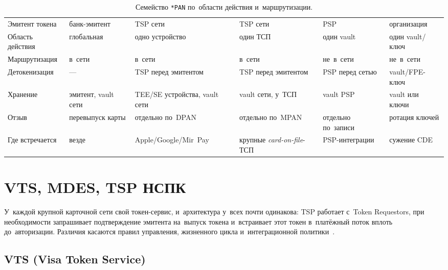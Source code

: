 \begin{table}[tbp]
  \caption{Семейство \texttt{*PAN} по~области действия и~маршрутизации.}\label{tab:token-scope-comparison}
  \begingroup
  \tablesetup
  \setlength{\tabcolsep}{3pt}
  \begin{tabularx}{\textwidth}{
      @{}P{0.16\textwidth}
      Y Y Y Y Y@{}
    }
    \toprule
    \headrow
     &  &  &  &
     &  \\
    \midrule
    Эмитент токена   & банк-эмитент & TSP сети & TSP сети & PSP & организация \\
    \rowsep
    Область действия & глобальная & одно устройство & один ТСП & один vault & один vault/ключ \\
    \rowsep
    Маршрутизация    & в~сети & в~сети & в~сети & не~в~сети & не~в~сети \\
    \rowsep
    Детокенизация    & --- & TSP перед эмитентом & TSP перед эмитентом & PSP перед сетью & vault/FPE-ключ \\
    \rowsep
    Хранение         & эмитент, vault сети & TEE/SE устройства, vault сети & vault сети, у~ТСП & vault PSP & vault или ключи \\
    \rowsep
    Отзыв            & перевыпуск карты & отдельно по~DPAN & отдельно по~MPAN & отдельно по~записи & ротация ключей \\
    \rowsep
    Где встречается  & везде & Apple/\allowbreak Google/\allowbreak Mir~Pay & крупные \textit{card-on-file}-ТСП & PSP-интеграции & сужение CDE \\
    \bottomrule
  \end{tabularx}\par
  \endgroup
\end{table}

\section{VTS, MDES, TSP НСПК}\label{sec:token-providers}

У~каждой крупной карточной сети свой токен-сервис, и~архитектура у~всех почти
одинакова: TSP работает с~Token Requestors, при необходимости запрашивает
подтверждение эмитента на~выпуск токена и~встраивает этот токен в~платёжный
поток вплоть до~авторизации. Различия касаются правил управления, жизненного
цикла и~интеграционной
политики~\cite{emvco-payment-tokenisation,emvco-payment-tokenisation-guide}.

\subsection*{VTS (Visa Token Service)}

